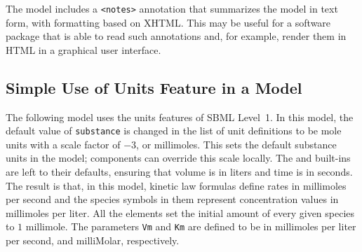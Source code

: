 \documentclass[10pt]{cekarticle}
\newcommand{\changed}[1]{\textcolor{BrickRed}{#1}}
\begin{document}
The model includes a \texttt{<notes>} annotation that summarizes the model
in text form, with formatting based on XHTML.  This may be useful for a
software package that is able to read such annotations and, for example,
render them in HTML in a graphical user interface.


\subsection{Simple Use of Units Feature in a Model}
\label{apdx:units-eg}

The following model uses the units features of SBML Level~1.  In this
model, the default value of \texttt{substance} is changed in the list of
unit definitions to be mole units with a scale factor of $-3$, or
millimoles.  This sets the default substance units in the model; components
can override this scale locally.  The  and 
built-ins are left to their defaults, ensuring that volume is in liters and
time is in seconds.  The result is that, in this model, kinetic law
formulas define rates in millimoles per second and the \changed{species}
symbols in them represent concentration values in millimoles per liter.
All the \changed{} elements set the initial amount of every
given \changed{species} to $1$ millimole.  The parameters \texttt{Vm} and
\texttt{Km} are defined to be in millimoles per liter per second, and
milliMolar, respectively.
\end{document}
